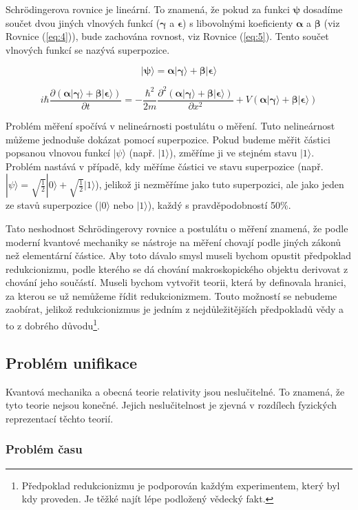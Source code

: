 Schrödingerova rovnice je lineární. To znamená, že pokud za funkci $\bm{\psi}$ dosadíme součet dvou jiných vlnových funkcí ($\bm{\gamma}$ a $\bm{\epsilon}$) s libovolnými koeficienty $\bm{\alpha}$ a $\bm{\beta}$ (viz Rovnice (\ref{eq:4})), bude zachována rovnost, viz Rovnice (\ref{eq:5}). Tento součet vlnových funkcí se nazývá superpozice.


\begin{equation}
    \bm{|\psi\rangle = \alpha|\gamma\rangle + \beta|\epsilon\rangle}
    \label{eq:4}
\end{equation}

\begin{equation}
    i\hbar \frac{\partial \bm{(\alpha|\gamma\rangle + \beta|\epsilon\rangle)}}{\partial t} = -\frac{\hbar^2}{2m}
    \frac{\partial^2 \bm{(\alpha|\gamma\rangle + \beta|\epsilon\rangle)}}{\partial x^2} + V \bm{(\alpha|\gamma\rangle + \beta|\epsilon\rangle)}
    \label{eq:5}
\end{equation}

Problém měření spočívá v nelineárnosti postulátu o měření. Tuto nelineárnost může\-me jednoduše dokázat pomocí superpozice. Pokud budeme měřit částici popsanou vlnovou funkcí $|\psi\rangle$ (např. $|1\rangle$), změříme ji ve stejném stavu $|1\rangle$. Problém nastává v případě, kdy měříme částici ve stavu superpozice (např. $|\psi\rangle = \sqrt{\frac{1}{2}}|0\rangle + \sqrt{\frac{1}{2}}|1\rangle$), jelikož ji nezměříme jako tuto superpozici, ale jako jeden ze stavů superpozice ($|0\rangle$ nebo $|1\rangle$), každý s pravděpodobností 50\%.

Tato neshodnost Schrödingerovy rovnice a postulátu o měření znamená, že podle moderní kvantové mechaniky se nástroje na měření chovají podle jiných zákonů než elementární částice. Aby toto dávalo smysl museli bychom opustit předpoklad redukcionizmu, podle kterého se dá chování makroskopického objektu derivovat z chování jeho součástí. Museli bychom vytvořit teorii, která by definovala hranici, za kterou se už nemůžeme řídit redukcionizmem. Touto možností se nebudeme zaobírat, jelikož redukcionizmus je jedním z nejdůležitějších předpokladů vědy a to z dobrého důvodu\footnote[1]{Předpoklad redukcionizmu je podporován každým experimentem, který byl kdy proveden. Je těžké najít lépe podložený vědecký fakt.}. 

\subsection{Problém unifikace}
Kvantová mechanika a obecná teorie relativity jsou neslučitelné. To znamená, že tyto teorie nejsou konečné. Jejich neslučitelnost je zjevná v rozdílech fyzických reprezentací těchto teorií. 
\subsubsection{Problém času}


